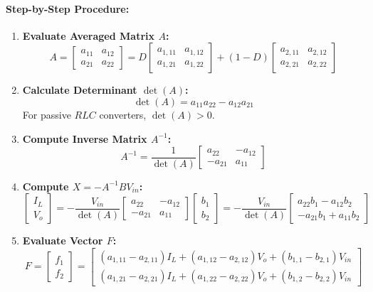 \paragraph{Step-by-Step Procedure:}
\begin{enumerate}
  \item \textbf{Evaluate Averaged Matrix $A$:}
  \[
  A = \begin{bmatrix} a_{11} & a_{12} \\ a_{21} & a_{22} \end{bmatrix} = D \begin{bmatrix} a_{1,11} & a_{1,12} \\ a_{1,21} & a_{1,22} \end{bmatrix} + (1-D) \begin{bmatrix} a_{2,11} & a_{2,12} \\ a_{2,21} & a_{2,22} \end{bmatrix}
  \]
  \item \textbf{Calculate Determinant $\det(A)$:}
  \[
  \det(A) = a_{11} a_{22} - a_{12} a_{21}
  \]
  For passive $RLC$ converters, $\det(A) > 0$.
  \item \textbf{Compute Inverse Matrix $A^{-1}$:}
  \[
  A^{-1} = \frac{1}{\det(A)} \begin{bmatrix} a_{22} & -a_{12} \\ -a_{21} & a_{11} \end{bmatrix}
  \]
  \item \textbf{Compute $X = -A^{-1} B V_{in}$:}
  \[
  \begin{bmatrix} I_L \\ V_o \end{bmatrix} = -\frac{V_{in}}{\det(A)} \begin{bmatrix} a_{22} & -a_{12} \\ -a_{21} & a_{11} \end{bmatrix} \begin{bmatrix} b_1 \\ b_2 \end{bmatrix} = -\frac{V_{in}}{\det(A)} \begin{bmatrix} a_{22} b_1 - a_{12} b_2 \\ -a_{21} b_1 + a_{11} b_2 \end{bmatrix}
  \]
  \item \textbf{Evaluate Vector $F$:}
  \[
  F = \begin{bmatrix} f_1 \\ f_2 \end{bmatrix} = \begin{bmatrix} (a_{1,11} - a_{2,11})I_L + (a_{1,12} - a_{2,12})V_o + (b_{1,1} - b_{2,1})V_{in} \\ (a_{1,21} - a_{2,21})I_L + (a_{1,22} - a_{2,22})V_o + (b_{1,2} - b_{2,2})V_{in} \end{bmatrix}
\]
\end{enumerate}
